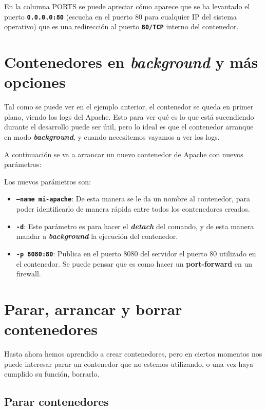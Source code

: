 En la columna PORTS se puede apreciar cómo aparece que se ha levantado el puerto  \textbf{ \texttt{0.0.0.0:80} } (escucha en el puerto 80 para cualquier IP del sistema operativo) que es una redirección al puerto \textbf{\texttt{80/TCP}} interno del contenedor.


\section{Contenedores en \textit{background} y más opciones}
Tal como se puede ver en el ejemplo anterior, el contenedor se queda en primer plano, viendo los logs del Apache. Esto para ver qué es lo que está sucendiendo durante el desarrollo puede ser útil, pero lo ideal es que el contenedor arranque en modo \textbf{\textit{background}}, y cuando necesitemos vayamos a ver los logs.


A continuación se va a arrancar un nuevo contenedor de Apache con nuevos parámetros:

Los nuevos parámetros son:
\begin{itemize}
    \item \textbf{\texttt{--name mi-apache}}: De esta manera se le da un nombre al contenedor, para poder identificarlo de manera rápida entre todos los contenedores creados.
    \item \textbf{\texttt{-d}}: Este parámetro es para hacer el \textbf{\textit{detach}} del comando, y de esta manera mandar a \textbf{\textit{background}} la ejecución del contenedor.
    \item \textbf{\texttt{-p 8080:80}}: Publica en el puerto 8080 del servidor el puerto 80 utilizado en el contenedor. Se puede pensar que es como hacer un \textbf{port-forward} en un firewall.
\end{itemize}

\section{Parar, arrancar y borrar contenedores}

Hasta ahora hemos aprendido a crear contenedores, pero en ciertos momentos nos puede interesar parar un contenedor que no estemos utilizando, o una vez haya cumplido su función, borrarlo.

\subsection{Parar contenedores}

